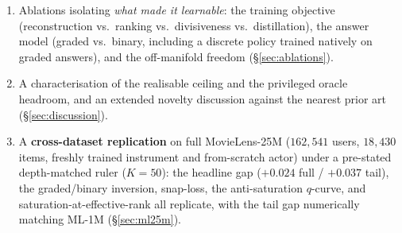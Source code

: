 \documentclass[11pt]{article}
\begin{document}
\begin{enumerate}
  questionnaire under the same objective and graded answer model (eight free directions asked of everyone, built by
  selection over the policy's own query distribution), the adaptive policy wins by $+0.023$ full / $+0.032$ tail---the
  single largest clean effect in the paper---and the static bank inverts under graded answers, localising the
  graded-continuity prize to adaptivity; an effective-rank analysis ($2.25/64$ concepts vs.\ $27.1/64$ items) explains
  why fixed banks saturate while the policy re-aims each turn (\S\ref{sec:static8}).
  \item Ablations isolating \emph{what made it learnable}: the training objective (reconstruction vs.\ ranking vs.\
  divisiveness vs.\ distillation), the answer model (graded vs.\ binary, including a discrete policy trained natively on
  graded answers), and the off-manifold freedom (\S\ref{sec:ablations}).
  \item A characterisation of the realisable ceiling and the privileged oracle headroom, and an extended novelty
  discussion against the nearest prior art (\S\ref{sec:discussion}).
  \item A \textbf{cross-dataset replication} on full MovieLens-25M ($162{,}541$ users, $18{,}430$ items, freshly
  trained instrument and from-scratch actor) under a pre-stated depth-matched ruler ($K{=}50$): the headline gap
  ($+0.024$ full / $+0.037$ tail), the graded/binary inversion, snap-loss, the anti-saturation $q$-curve, and
  saturation-at-effective-rank all replicate, with the tail gap numerically matching ML-1M (\S\ref{sec:ml25m}).
\end{enumerate}
\end{document}
